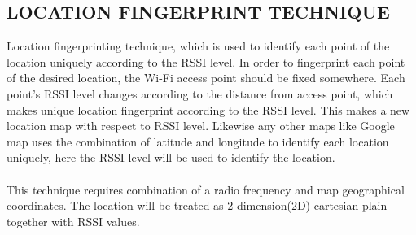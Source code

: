 \subsection{LOCATION FINGERPRINT TECHNIQUE}

Location fingerprinting technique, which is used to identify each point of the location uniquely according to the RSSI level. In order to fingerprint each point of the desired location, the Wi-Fi access point should be fixed somewhere. Each point's RSSI level changes according to the distance from access point, which makes unique location fingerprint according to the RSSI level. This makes a new location map with respect to RSSI level. Likewise any other maps like Google map uses the combination of latitude and longitude to identify each location uniquely, here the RSSI level will be used to identify the location.

\paragraph{}
This technique requires combination of a radio frequency and map geographical coordinates. The location will be treated as 2-dimension(2D) cartesian plain together with RSSI values.

